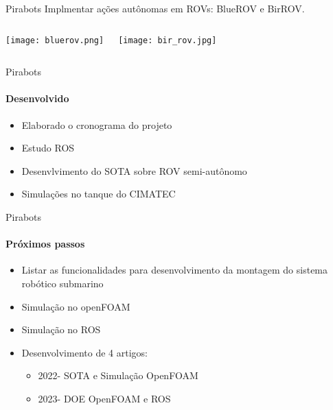 \begin{frame}[t]{Pirabots}
     Implmentar ações autônomas em ROVs: BlueROV e BirROV.
      
   
    \begin{columns}
    \begin{center}

        \texttt{[image: bluerov.png]}

    \end{center}

    \vspace*{0.3cm}
    \begin{center}

        \texttt{[image: bir\_rov.jpg]}

    \end{center}

\end{columns}

\end{frame}
\begin{frame}[t]{Pirabots}
    \framesubtitle{Desenvolvido}
    \begin{itemize}
        \item Elaborado o cronograma do projeto
        \item Estudo ROS
        \item Desenvlvimento do SOTA sobre ROV semi-autônomo
        \item Simulações no tanque do CIMATEC
    \end{itemize}    
\end{frame}
\begin{frame}[t]{Pirabots}
    \framesubtitle{Próximos passos}
    \begin{itemize}
        \item Listar as funcionalidades para desenvolvimento da montagem do sistema robótico submarino
        \item Simulação no openFOAM
        \item Simulação no ROS
        \item Desenvolvimento de 4 artigos: 
        \begin{itemize}
            \item[] 2022- SOTA e Simulação OpenFOAM
            \item[] 2023- DOE OpenFOAM e ROS 
        \end{itemize}  
        
    \end{itemize}    
\end{frame}

